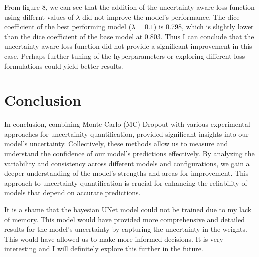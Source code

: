 \documentclass{article}
\begin{document}
From figure 8, we can see that the addition of the uncertainty-aware loss function using differnt values of \(\lambda\)
did not improve the model's performance. The dice coefficient of the best performing model (\(\lambda = 0.1\)) is 0.798, 
which is slightly lower than the dice coefficient of the base model at 0.803. Thus I can conclude that the uncertainty-aware
loss function did not provide a significant improvement in this case. Perhaps further tuning of the hyperparameters or
exploring different loss formulations could yield better results.

\section{Conclusion}

In conclusion, combining Monte Carlo (MC) Dropout with various experimental approaches for uncertainity quantification, 
provided significant insights into our model's uncertainty. Collectively, these methods allow us to measure and 
understand the confidence of our model's predictions 
effectively. By analyzing the variability and consistency across different models and configurations, we gain a deeper 
understanding of the model's strengths and areas for improvement. This approach to uncertainty quantification is crucial 
for enhancing the reliability of models that depend on accurate predictions.
\vspace{1em}

It is a shame that the bayesian UNet model could not be trained due to my lack of memory. This model would have
provided more comprehensive and detailed results for the model's uncertainty by capturing the uncertainty in the weights. 
This would have allowed us to make more informed decisions. It is very interesting and I will definitely 
explore this further in the future.
\end{document}
